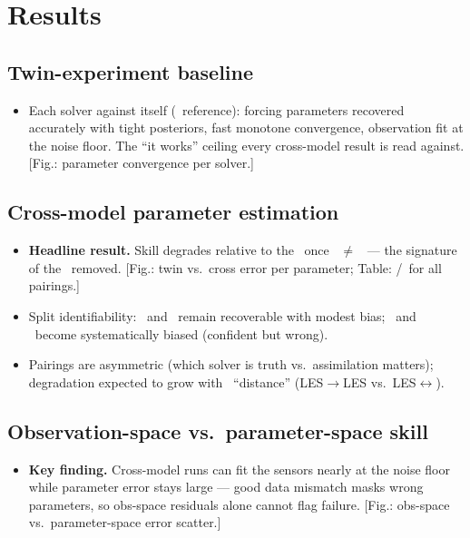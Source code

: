 \section{Results}
\label{sec:results}


\subsection{Twin-experiment baseline}
\label{sec:results:twin}
\begin{itemize}
  \item Each solver against itself (\invcrime\ reference): forcing parameters
        recovered accurately with tight posteriors, fast monotone convergence,
        observation fit at the noise floor. The ``it works'' ceiling every
        cross-model result is read against. [Fig.: parameter convergence per
        solver.]
\end{itemize}

\subsection{Cross-model parameter estimation}
\label{sec:results:cross}
\begin{itemize}
  \item \textbf{Headline result.} Skill degrades relative to the \twinexp\
        once \truthmodel\ $\neq$ \assimmodel\ --- the signature of the
        \invcrime\ removed. [Fig.: twin vs.\ cross error per parameter;
        Table: \RMSE/\CRPS\ for all pairings.]
  \item Split identifiability: \inflowangle\ and \velmag\ remain recoverable
        with modest bias; \shearexp\ and \sgs\ become systematically biased
        (confident but wrong).
  \item Pairings are asymmetric (which solver is truth vs.\ assimilation
        matters); degradation expected to grow with \discrepancy\ ``distance''
        (LES$\to$LES vs.\ LES$\leftrightarrow$\lbmmodel).
\end{itemize}

\subsection{Observation-space vs.\ parameter-space skill}
\label{sec:results:obsvsparam}
\begin{itemize}
  \item \textbf{Key finding.} Cross-model runs can fit the sensors nearly at
        the noise floor while parameter error stays large --- good data
        mismatch masks wrong parameters, so obs-space residuals alone cannot
        flag failure. [Fig.: obs-space vs.\ parameter-space error scatter.]
\end{itemize}

